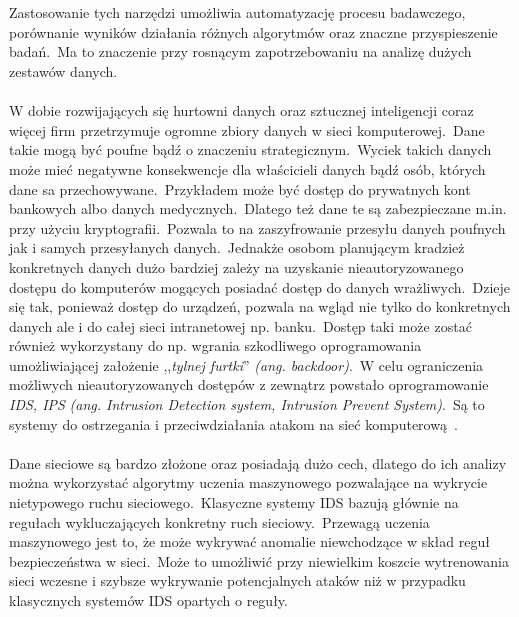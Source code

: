 \\ \\
Zastosowanie tych narzędzi umożliwia automatyzację procesu badawczego, porównanie wyników działania różnych algorytmów oraz znaczne przyspieszenie badań.\ Ma to znaczenie przy rosnącym zapotrzebowaniu na analizę dużych zestawów danych.
\\ \\
W dobie rozwijających się hurtowni danych oraz sztucznej inteligencji coraz więcej firm przetrzymuje ogromne zbiory danych w sieci komputerowej.\ Dane takie mogą być poufne bądź o znaczeniu strategicznym.\ Wyciek takich danych może mieć negatywne konsekwencje dla właścicieli danych bądź osób, których dane sa przechowywane.\ Przykładem może być dostęp do prywatnych kont bankowych albo danych medycznych.\ Dlatego też dane te są zabezpieczane m.in. przy użyciu kryptografii.\ Pozwala to na zaszyfrowanie przesyłu danych poufnych jak i samych przesyłanych danych.\ Jednakże osobom planującym kradzież konkretnych danych dużo bardziej zależy na uzyskanie nieautoryzowanego dostępu do komputerów mogących posiadać dostęp do danych wrażliwych.\ Dzieje się tak, ponieważ dostęp do urządzeń, pozwala na wgląd nie tylko do konkretnych danych ale i do całej sieci intranetowej np. banku.\ Dostęp taki może zostać również wykorzystany do np. wgrania szkodliwego oprogramowania umożliwiającej założenie ,,\textit{tylnej furtki}'' \textit{(ang. backdoor)}.\ W celu ograniczenia możliwych nieautoryzowanych dostępów z zewnątrz powstało oprogramowanie \textit{IDS, IPS} \textit{(ang. Intrusion Detection system, Intrusion Prevent System)}.\ Są to systemy do ostrzegania i przeciwdziałania atakom na sieć komputerową~\cite{Blyszcz2022}.
\\ \\
Dane sieciowe są bardzo złożone oraz posiadają dużo cech, dlatego do ich analizy można wykorzystać algorytmy uczenia maszynowego pozwalające na wykrycie nietypowego ruchu sieciowego.\ Klasyczne systemy IDS bazują głównie na regułach wykluczających konkretny ruch sieciowy.\ Przewagą uczenia maszynowego jest to, że może wykrywać anomalie niewchodzące w skład reguł bezpieczeństwa w sieci.\ Może to umożliwić przy niewielkim koszcie wytrenowania sieci wczesne i szybsze wykrywanie potencjalnych ataków niż w przypadku klasycznych systemów IDS opartych o reguły.


